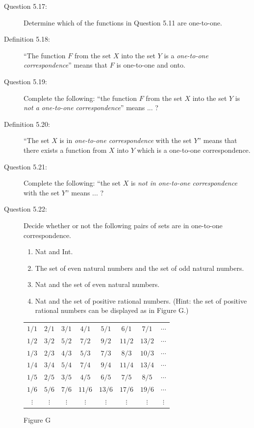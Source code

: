 \documentclass{book}
\begin{document}
\begin{description}
\item[Question 5.17:] Determine which of the functions in Question 5.11 are one-to-one.

\item[Definition 5.18:] ``The function $F$ from the set $X$ into the set $Y$ is a \emph{one-to-one correspondence}'' means that $F$ is one-to-one and onto.

\item[Question 5.19:] Complete the following: ``the function $F$ from the set $X$ into the set $Y$ is \emph{not a one-to-one correspondence}'' means ... ?

\item[Definition 5.20:] ``The set $X$ is in \emph{one-to-one correspondence} with the set $Y$'' means that there exists a function from $X$ into $Y$ which is a one-to-one correspondence.

\item[Question 5.21:] Complete the following: ``the set $X$ is \emph{not in one-to-one correspondence} with the set $Y$'' means ... ?

\item[Question 5.22:] Decide whether or not the following pairs of sets are in one-to-one correspondence.
\begin{enumerate}[\hspace{1cm}(a)]
  \item Nat and Int.
  \item The set of even natural numbers and the set of odd natural numbers.
  \item Nat and the set of even natural numbers.
  \item Nat and the set of positive rational numbers. (Hint: the set of positive rational numbers can be displayed as in Figure G.)
\end{enumerate}

\begin{center}
\begin{tabular}{cccccccc}
  $1/1$    &  $2/1$   &  $3/1$   &  $4/1$   &  $5/1$   &  $6/1$   &  $7/1$   & $\cdots$ \\
  $1/2$    &  $3/2$   &  $5/2$   &  $7/2$   &  $9/2$   & $11/2$   & $13/2$   & $\cdots$ \\
  $1/3$    &  $2/3$   &  $4/3$   &  $5/3$   &  $7/3$   &  $8/3$   & $10/3$   & $\cdots$ \\
  $1/4$    &  $3/4$   &  $5/4$   &  $7/4$   &  $9/4$   & $11/4$   & $13/4$   & $\cdots$ \\
  $1/5$    &  $2/5$   &  $3/5$   &  $4/5$   &  $6/5$   &  $7/5$   &  $8/5$   & $\cdots$ \\
  $1/6$    &  $5/6$   &  $7/6$   & $11/6$   & $13/6$   & $17/6$   & $19/6$   & $\cdots$ \\
  $\vdots$ & $\vdots$ & $\vdots$ & $\vdots$ & $\vdots$ & $\vdots$ & $\vdots$ & $\vdots$ \\
\end{tabular}
\end{center}
\begin{center}
Figure G
\end{center}


\end{description}
\end{document}
